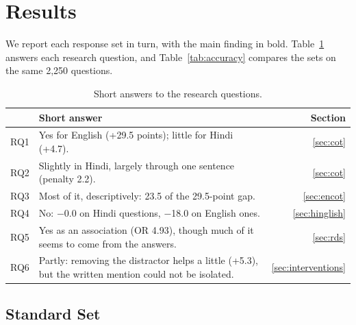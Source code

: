 \documentclass[11pt]{article}
\begin{document}
\section{Results}
\label{sec:results}

We report each response set in turn, with the main finding in bold. Table~\ref{tab:summary} answers each research question, and Table~\ref{tab:accuracy} compares the sets on the same 2,250 questions.

\begin{table}[t]
\centering
\setlength{\tabcolsep}{3pt}
\begin{tabularx}{\columnwidth}{@{}l>{\raggedright\arraybackslash}Xr@{}}
\toprule
& Short answer & Section \\
\midrule
RQ1 & Yes for English (+29.5 points); little for Hindi (+4.7). & \ref{sec:cot} \\
RQ2 & Slightly in Hindi, largely through one sentence (penalty 2.2). & \ref{sec:cot} \\
RQ3 & Most of it, descriptively: 23.5 of the 29.5-point gap. & \ref{sec:encot} \\
RQ4 & No: $-$0.0 on Hindi questions, $-$18.0 on English ones. & \ref{sec:hinglish} \\
RQ5 & Yes as an association (OR 4.93), though much of it seems to come from the answers. & \ref{sec:rds} \\
RQ6 & Partly: removing the distractor helps a little (+5.3), but the written mention could not be isolated. & \ref{sec:interventions} \\
\bottomrule
\end{tabularx}
\caption{Short answers to the research questions.}
\label{tab:summary}
\end{table}

\begin{table}[t]
\centering

\caption{Answered accuracy (\%) on the same 2,250 questions, by task, level and distractor condition. The last row counts unanswered responses as wrong. Differences in the text are computed before rounding, so they can differ from these cells by 0.1.}
\label{tab:accuracy}
\end{table}

\subsection{Standard Set}
\label{sec:standard}

\begin{table}[t]
\centering
\setlength{\tabcolsep}{4pt}

\caption{CoT gain on all 6,750 questions, in percentage points. Values are answered except the Strict column. Intervals on the gains are English [28.5, 30.6] and Hindi [3.6, 5.7]. Gains and gaps are computed before rounding.}
\label{tab:baseline}
\end{table}
\end{document}
